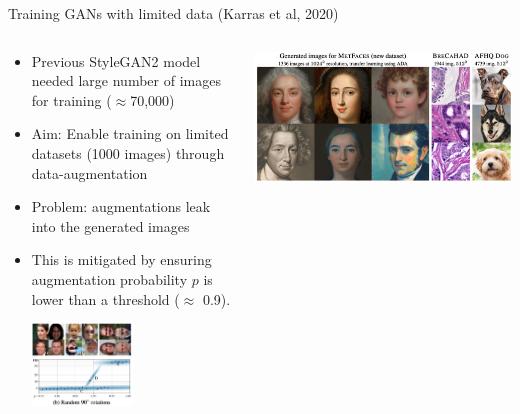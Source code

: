 \documentclass[8pt,xcolor=table,aspectratio=169]{beamer}
\begin{document}
\begin{frame}{Training GANs with limited data (Karras et al, 2020)}

\begin{columns}
\begin{column}{0.5\textwidth}

\begin{itemize}
 \item Previous StyleGAN2 model needed large number of images for training ($\approx$70,000)
 
 \vspace{2em} 
 
 \item Aim: Enable training on limited datasets (1000 images) through data-augmentation

 \vspace{2em} 
 
 \item Problem: augmentations leak into the generated images 

 \vspace{2em} 
 
 \item This is mitigated by ensuring augmentation probability $p$ is lower than a threshold ($\approx$ 0.9). 
 
\begin{center} 
 \includegraphics[width=0.5\textwidth]{6H58wvx.png}
\end{center}

\end{itemize}
\end{column}
\begin{column}{0.5\textwidth}
\centering

\includegraphics[width=\textwidth]{s4QcxZ4.jpg}


\end{column}
\end{columns}
\end{frame}
\end{document}

